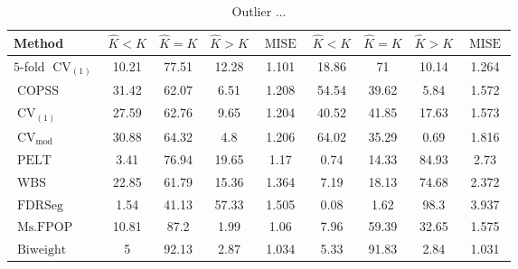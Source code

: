 \begin{table}[ht]
\centering
\begin{tabular}{|l|cccc|cccc|}
  \hline
Method & $\hat{K} < K$ & $\hat{K} = K$ & $\hat{K} > K$ & $\operatorname{MISE}$ & $\hat{K} < K$ & $\hat{K} = K$ & $\hat{K} > K$ & $\operatorname{MISE}$ \\ 
  \hline
$5$-fold $\operatorname{CV}_{(1)}$ & 10.21 & 77.51 & 12.28 & 1.101 & 18.86 &    71 & 10.14 & 1.264 \\ 
  $\operatorname{COPSS}$ & 31.42 & 62.07 &  6.51 & 1.208 & 54.54 & 39.62 &  5.84 & 1.572 \\ 
  $\operatorname{CV}_{(1)}$ & 27.59 & 62.76 &  9.65 & 1.204 & 40.52 & 41.85 & 17.63 & 1.573 \\ 
  $\operatorname{CV}_{\operatorname{mod}}$ & 30.88 & 64.32 &   4.8 & 1.206 & 64.02 & 35.29 &  0.69 & 1.816 \\ 
  $\operatorname{PELT}$ &  3.41 & 76.94 & 19.65 &  1.17 &  0.74 & 14.33 & 84.93 &  2.73 \\ 
  $\operatorname{WBS}$ & 22.85 & 61.79 & 15.36 & 1.364 &  7.19 & 18.13 & 74.68 & 2.372 \\ 
  $\operatorname{FDRSeg}$ &  1.54 & 41.13 & 57.33 & 1.505 &  0.08 &  1.62 &  98.3 & 3.937 \\ 
  $\operatorname{Ms.FPOP}$ & 10.81 &  87.2 &  1.99 &  1.06 &  7.96 & 59.39 & 32.65 & 1.575 \\ 
  $\operatorname{Biweight}$ &     5 & 92.13 &  2.87 & 1.034 &  5.33 & 91.83 &  2.84 & 1.031 \\ 
   \hline
\end{tabular}
\caption{Outlier ...} 
\end{table}
